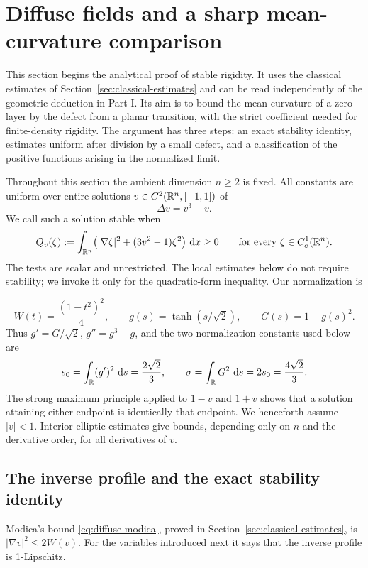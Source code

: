 \section{Diffuse fields and a sharp mean-curvature comparison}
\label{sec:diffuse}

This section begins the analytical proof of stable rigidity. It uses the
classical estimates of Section~\ref{sec:classical-estimates} and can be
read independently of the geometric deduction in Part I. Its aim is to
bound the mean curvature of a zero layer by the defect from a planar
transition, with the strict coefficient needed for finite-density
rigidity. The argument has three steps: an exact stability identity,
estimates uniform after division by a small defect, and a classification
of the positive functions arising in the normalized limit.

Throughout this section the ambient dimension $n\ge2$ is fixed. All constants
are uniform over entire solutions $v\in C^2(\mathbb R^n,[-1,1])$ of
\begin{equation}\label{eq:diffuse-equation}
 \Delta v=v^3-v.
\end{equation}
We call such a solution stable when
\[
 Q_v(\zeta):=\int_{\mathbb R^n}
   \bigl(|\nabla\zeta|^2+(3v^2-1)\zeta^2\bigr)\,\,\mathrm d x\ge0
 \qquad\text{for every }\zeta\in C_c^1(\mathbb R^n).
\]
The tests are scalar and unrestricted. The local estimates below do not
require stability; we invoke it only for the quadratic-form inequality.
Our normalization is

\[
 W(t)=\frac{(1-t^2)^2}{4},\qquad
 g(s)=\tanh(s/\sqrt2),\qquad G(s)=1-g(s)^2.
\]
Thus $g'=G/\sqrt2$, $g''=g^3-g$, and the two normalization constants used
below are
\begin{equation}\label{eq:diffuse-tension}
 s_0=\int_\mathbb R(g')^2\,\,\mathrm d s=\frac{2\sqrt2}{3},\qquad
 \sigma=\int_\mathbb R G^2\,\,\mathrm d s=2s_0=\frac{4\sqrt2}{3}.
\end{equation}
The strong maximum principle applied to $1-v$ and $1+v$ shows that a
solution attaining either endpoint is identically that endpoint. We henceforth
assume $|v|<1$. Interior elliptic estimates give bounds, depending only on
$n$ and the derivative order, for all derivatives of $v$.

\subsection{The inverse profile and the exact stability identity}

Modica's bound \eqref{eq:diffuse-modica}, proved in
Section~\ref{sec:classical-estimates}, is $|\nabla v|^2\le2W(v)$.
For the variables introduced next it says that the inverse profile is
1-Lipschitz.

